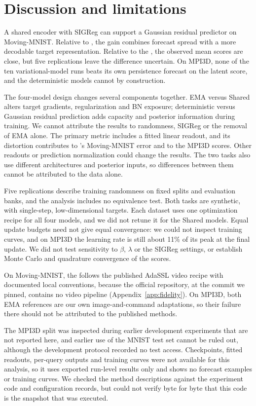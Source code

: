 \section{Discussion and limitations}
\label{sec:discussion}

A shared encoder with SIGReg can support a Gaussian residual predictor on Moving-MNIST. Relative to \shdet{}, the gain combines forecast spread with a more decodable target representation. Relative to the \emavar{}, the observed mean scores are close, but five replications leave the difference uncertain. On MPI3D, none of the ten variational-model runs beats its own persistence forecast on the latent score, and the deterministic models cannot by construction.

The four-model design changes several components together. EMA versus Shared alters target gradients, regularization and BN exposure; deterministic versus Gaussian residual prediction adds capacity and posterior information during training. We cannot attribute the results to randomness, SIGReg or the removal of EMA alone. The primary metric includes a fitted linear readout, and its distortion contributes to \shdet{}'s Moving-MNIST error and to the MPI3D scores. Other readouts or prediction normalization could change the results. The two tasks also use different architectures and posterior inputs, so differences between them cannot be attributed to the data alone.

Five replications describe training randomness on fixed splits and evaluation banks, and the analysis includes no equivalence test. Both tasks are synthetic, with single-step, low-dimensional targets. Each dataset uses one optimization recipe for all four models, and we did not retune it for the Shared models. Equal update budgets need not give equal convergence: we could not inspect training curves, and on MPI3D the learning rate is still about 11\% of its peak at the final update. We did not test sensitivity to $\beta$, $\lambda$ or the SIGReg settings, or establish Monte Carlo and quadrature convergence of the scores.

On Moving-MNIST, the \emavar{} follows the published AdaSSL video recipe with documented local conventions, because the official repository, at the commit we pinned, contains no video pipeline (Appendix~\ref{app:fidelity}). On MPI3D, both EMA references are our own image-and-command adaptations, so their failure there should not be attributed to the published methods.

The MPI3D split was inspected during earlier development experiments that are not reported here, and earlier use of the MNIST test set cannot be ruled out, although the development protocol recorded no test access. Checkpoints, fitted readouts, per-query outputs and training curves were not available for this analysis, so it uses exported run-level results only and shows no forecast examples or training curves. We checked the method descriptions against the experiment code and configuration records, but could not verify byte for byte that this code is the snapshot that was executed.
